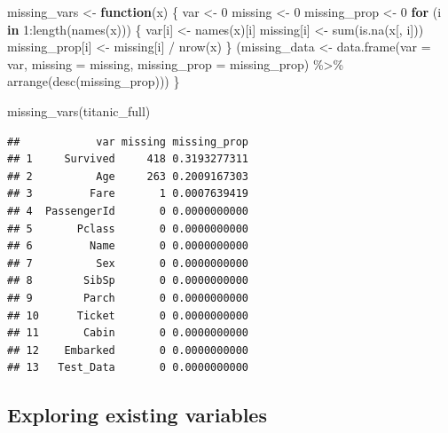 \documentclass[
]{article}
\newenvironment{Shaded}{\begin{snugshade}}{\end{snugshade}}
\newcommand{\AttributeTok}[1]{\textcolor[rgb]{0.77,0.63,0.00}{#1}}
\newcommand{\ControlFlowTok}[1]{\textcolor[rgb]{0.13,0.29,0.53}{\textbf{#1}}}
\newcommand{\DecValTok}[1]{\textcolor[rgb]{0.00,0.00,0.81}{#1}}
\newcommand{\FunctionTok}[1]{\textcolor[rgb]{0.00,0.00,0.00}{#1}}
\newcommand{\NormalTok}[1]{#1}
\newcommand{\OtherTok}[1]{\textcolor[rgb]{0.56,0.35,0.01}{#1}}
\newcommand{\SpecialCharTok}[1]{\textcolor[rgb]{0.00,0.00,0.00}{#1}}
\begin{document}
\begin{Shaded}
\begin{Highlighting}[]
\NormalTok{missing\_vars }\OtherTok{\textless{}{-}} \ControlFlowTok{function}\NormalTok{(x) \{}
\NormalTok{  var }\OtherTok{\textless{}{-}} \DecValTok{0}
\NormalTok{  missing }\OtherTok{\textless{}{-}} \DecValTok{0}
\NormalTok{  missing\_prop }\OtherTok{\textless{}{-}} \DecValTok{0}
  \ControlFlowTok{for}\NormalTok{ (i }\ControlFlowTok{in} \DecValTok{1}\SpecialCharTok{:}\FunctionTok{length}\NormalTok{(}\FunctionTok{names}\NormalTok{(x))) \{}
\NormalTok{    var[i] }\OtherTok{\textless{}{-}} \FunctionTok{names}\NormalTok{(x)[i]}
\NormalTok{    missing[i] }\OtherTok{\textless{}{-}} \FunctionTok{sum}\NormalTok{(}\FunctionTok{is.na}\NormalTok{(x[, i]))}
\NormalTok{    missing\_prop[i] }\OtherTok{\textless{}{-}}\NormalTok{ missing[i] }\SpecialCharTok{/} \FunctionTok{nrow}\NormalTok{(x)}
\NormalTok{  \}}
\NormalTok{  (missing\_data }\OtherTok{\textless{}{-}} \FunctionTok{data.frame}\NormalTok{(}\AttributeTok{var =}\NormalTok{ var, }\AttributeTok{missing =}\NormalTok{ missing, }\AttributeTok{missing\_prop =}\NormalTok{ missing\_prop) }\SpecialCharTok{\%\textgreater{}\%} 
      \FunctionTok{arrange}\NormalTok{(}\FunctionTok{desc}\NormalTok{(missing\_prop)))}
\NormalTok{\}}
\end{Highlighting}
\end{Shaded}

\begin{Shaded}
\begin{Highlighting}[]
\FunctionTok{missing\_vars}\NormalTok{(titanic\_full)}
\end{Highlighting}
\end{Shaded}

\begin{verbatim}
##            var missing missing_prop
## 1     Survived     418 0.3193277311
## 2          Age     263 0.2009167303
## 3         Fare       1 0.0007639419
## 4  PassengerId       0 0.0000000000
## 5       Pclass       0 0.0000000000
## 6         Name       0 0.0000000000
## 7          Sex       0 0.0000000000
## 8        SibSp       0 0.0000000000
## 9        Parch       0 0.0000000000
## 10      Ticket       0 0.0000000000
## 11       Cabin       0 0.0000000000
## 12    Embarked       0 0.0000000000
## 13   Test_Data       0 0.0000000000
\end{verbatim}

\hypertarget{exploring-existing-variables}{%
\subsection{\texorpdfstring{\textbf{Exploring existing
variables}}{Exploring existing variables}}\label{exploring-existing-variables}}
\end{document}

